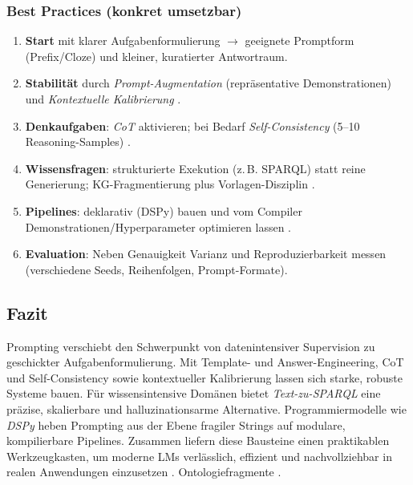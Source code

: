 \subsubsection*{Best Practices (konkret umsetzbar)}
\begin{enumerate}
  \item \textbf{Start} mit klarer Aufgabenformulierung \(\rightarrow\) geeignete Promptform (Prefix/Cloze) und kleiner, kuratierter Antwortraum.
  \item \textbf{Stabilität} durch \emph{Prompt-Augmentation} (repräsentative Demonstrationen) und \emph{Kontextuelle Kalibrierung} \cite{zhao2021calibrate}.
  \item \textbf{Denkaufgaben}: \emph{CoT} aktivieren; bei Bedarf \emph{Self-Consistency} (5–10 Reasoning-Samples) \cite{wei2022cot,wang2022selfconsistency}.
  \item \textbf{Wissensfragen}: strukturierte Exekution (z.\,B. SPARQL) statt reine Generierung; KG-Fragmentierung plus Vorlagen-Disziplin \cite{avila2024autokgqagpt}.
  \item \textbf{Pipelines}: deklarativ (DSPy) bauen und vom Compiler Demonstrationen/Hyperparameter optimieren lassen \cite{khattab2023dspy}.
  \item \textbf{Evaluation}: Neben Genauigkeit Varianz und Reproduzierbarkeit messen (verschiedene Seeds, Reihenfolgen, Prompt-Formate).
\end{enumerate}

\subsection{Fazit}
Prompting verschiebt den Schwerpunkt von datenintensiver Supervision zu geschickter Aufgabenformulierung. Mit Template- und Answer-Engineering, CoT und Self-Consistency sowie kontextueller Kalibrierung lassen sich starke, robuste Systeme bauen. Für wissensintensive Domänen bietet \emph{Text-zu-SPARQL} eine präzise, skalierbare und halluzinationsarme Alternative. Programmiermodelle wie \emph{DSPy} heben Prompting aus der Ebene fragiler Strings auf modulare, kompilierbare Pipelines. Zusammen liefern diese Bausteine einen praktikablen Werkzeugkasten, um moderne LMs verlässlich, effizient und nachvollziehbar in realen Anwendungen einzusetzen \cite{liu2023survey,wei2022cot,wang2022selfconsistency,zhao2021calibrate,avila2024autokgqagpt,khattab2023dspy}.
Ontologiefragmente \cite{avila2024text2sparql}.





